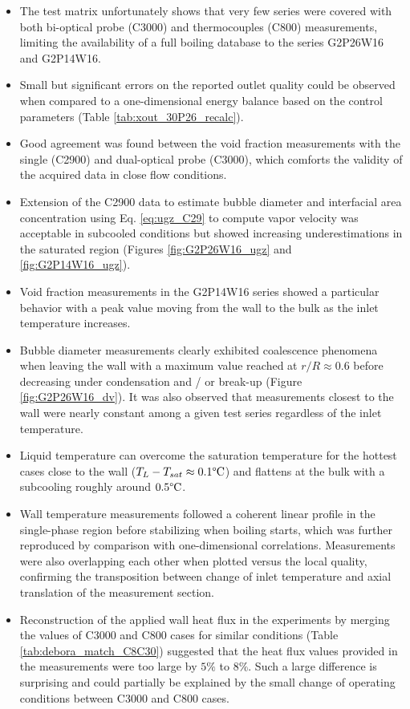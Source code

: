 \begin{itemize}
\item The test matrix unfortunately shows that very few series were covered with both bi-optical probe (C3000) and thermocouples (C800) measurements, limiting the availability of a full boiling database to the series G2P26W16 and G2P14W16.

\item Small but significant errors on the reported outlet quality could be observed when compared to a one-dimensional energy balance based on the control parameters (Table \ref{tab:xout_30P26_recalc}).

\item Good agreement was found between the void fraction measurements with the single (C2900) and dual-optical probe (C3000), which comforts the validity of the acquired data in close flow conditions.

\item Extension of the C2900 data to estimate bubble diameter and interfacial area concentration using Eq. \ref{eq:ugz_C29} to compute vapor velocity was acceptable in subcooled conditions but showed increasing underestimations in the saturated region (Figures \ref{fig:G2P26W16_ugz} and \ref{fig:G2P14W16_ugz}).

\item Void fraction measurements in the G2P14W16 series showed a particular behavior with a peak value moving from the wall to the bulk as the inlet temperature increases.

\item Bubble diameter measurements clearly exhibited coalescence phenomena when leaving the wall with a maximum value reached at $r/R \approx 0.6$ before decreasing under condensation and / or break-up (Figure \ref{fig:G2P26W16_dv}). It was also observed that measurements closest to the wall were nearly constant among a given test series regardless of the inlet temperature.

\item Liquid temperature can overcome the saturation temperature for the hottest cases close to the wall ($T_{L}-T_{sat}\approx 0.1\degree\mathrm{C}$) and flattens at the bulk with a subcooling roughly around $0.5\degree\mathrm{C}$.

\item Wall temperature measurements followed a coherent linear profile in the single-phase region before stabilizing when boiling starts, which was further reproduced by comparison with one-dimensional correlations. Measurements were also overlapping each other when plotted versus the local quality, confirming the transposition between change of inlet temperature and axial translation of the measurement section.

\item Reconstruction of the applied wall heat flux in the experiments by merging the values of C3000 and C800 cases for similar conditions (Table \ref{tab:debora_match_C8C30}) suggested that the heat flux values provided in the measurements were too large by $5\%$ to $8\%$. Such a large difference is surprising and could partially be explained by the small change of operating conditions between C3000 and C800 cases.
\end{itemize}


